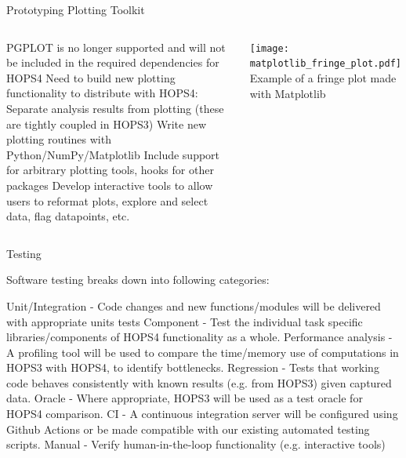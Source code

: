 \documentclass[8pt]{beamer}
\begin{document}


\begin{frame}{Prototyping Plotting Toolkit}
\begin{columns}
\begin{outline}
    \1 PGPLOT is no longer supported and will not be included in the required dependencies for HOPS4
    \1 Need to build new plotting functionality to distribute with HOPS4:
    \2 Separate analysis results from plotting (these are tightly coupled in HOPS3)
    \2 Write new plotting routines with Python/NumPy/Matplotlib
    \2 Include support for arbitrary plotting tools, hooks for other packages
    \2 Develop interactive tools to allow users to reformat plots, explore and select data, flag datapoints, etc.
\end{outline}
\centering
\texttt{[image: matplotlib\_fringe\_plot.pdf]}
Example of a fringe plot made with Matplotlib
\end{columns}
\end{frame}



\begin{frame}{Testing}


Software testing breaks down into following categories:

    \begin{outline}
        \1 Unit/Integration - Code changes and new functions/modules will be delivered with appropriate units tests
         \1 Component - Test the individual task specific libraries/components of HOPS4 functionality as a whole.
        \1 Performance analysis - A profiling tool will be used to compare the time/memory use of computations in HOPS3 with HOPS4, to identify bottlenecks.
        \1 Regression - Tests that working code behaves consistently with known results (e.g. from HOPS3) given captured data.
        \1 Oracle - Where appropriate, HOPS3 will be used as a test oracle for HOPS4 comparison.
        \1 CI - A continuous integration server will be configured using Github Actions or be made compatible with our existing automated testing scripts.
        \1 Manual - Verify human-in-the-loop functionality (e.g. interactive tools)
    \end{outline}
    
\end{frame}
\end{document}
